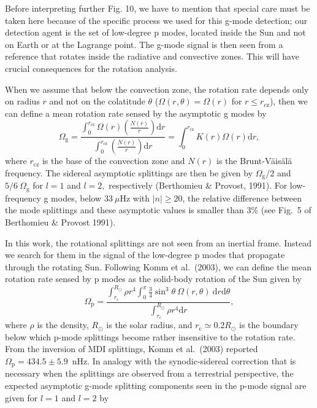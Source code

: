 \documentclass[bibyear]{aa}
\begin{document}
Before interpreting further Fig. 10, we have to mention that 
special care must be taken here because of the specific process we used for this g-mode detection; our detection agent is the set of low-degree p modes, located inside the Sun and not on Earth or at the Lagrange point. The g-mode signal is then seen from a reference that rotates inside the radiative and convective zones. This will have crucial consequences for the rotation analysis.

When we assume that below the convection zone, the rotation rate depends only on radius $r$ and not 
on the colatitude $\theta$ ($\Omega(r,\theta)=\Omega(r)$ for $r\le r_\mathrm{cz}$), 
then we can define a mean rotation rate sensed by the asymptotic g modes by
\begin{equation}\label{eq:omegag}
\Omega_\mathrm{g} = {\frac{\int_0^{r_{\mathrm{cz}}}{\Omega(r)\left(\frac{N(r)}{r}\right)\mathrm{d}r}}{\int_0^{r_{\mathrm{cz}}}{\left(\frac{N(r)}{r}\right)\mathrm{d}r}}}=\int_0^{r_{\mathrm{cz}}}{K(r)\Omega(r)\mathrm{d}r}
,\end{equation} 
where $r_\mathrm{cz}$ is the base of the convection zone and $N(r)$ is the Brunt-V\"ais\"al\"a frequency.
The sidereal asymptotic splittings are then be given by $\Omega_\mathrm{g}/2$ and $5/6\ \Omega_\mathrm{g}$ for 
$l=1$ and $l=2,$ respectively (Berthomieu \& Provost, 1991).
For low-frequency g modes, below $33\ \mu$Hz with $|n|\ge 20$, the relative difference 
between the mode splittings and these asymptotic values is smaller 
than 3\% (see Fig.~5 of Berthomieu \& Provost 1991).

In this work, the rotational splittings are not seen from an inertial frame. Instead 
we search for them in the signal of the low-degree p modes that 
propagate through the rotating Sun. 
Following Komm et al.~(2003), we can define the mean rotation rate sensed by p modes 
as the solid-body rotation of the Sun given by
\begin{equation}
\Omega_\mathrm{p}={\frac{\int_{r_\mathrm{c}}^{R_\odot}{\rho r^4 \int_0^\pi{\frac{3}{4}\sin^3\theta\ \Omega(r,\theta)}}\ \mathrm{d}r\mathrm{d}\theta}{\int_{r_\mathrm{c}}^{R_\odot}\rho r^4 \mathrm{d}r}}
,\end{equation}
where $\rho$ is the density, $R_\odot$ is the solar radius, and $r_\mathrm{c}\simeq 0.2 R_\odot$ is the boundary below which p-mode splittings become rather insensitive to the rotation rate. From the inversion of MDI splittings, Komm et al.~(2003) reported $\Omega_\mathrm{p}=434.5\pm5.9$~nHz.  In analogy with the synodic-sidereal correction that is necessary when the splittings 
are observed from a terrestrial perspective, the expected asymptotic g-mode splitting components seen in the p-mode signal 
are given for $l=1$ and $l=2$ by
\end{document}
